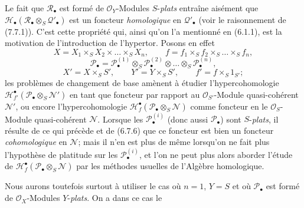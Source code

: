 \begin{scholium}[6.10.4]
Le fait que $\mathscr R_\bullet$ est formé de $\mathscr O_Y$-Modules
$S$-\emph{plats} entraîne aisément que $\mathscr H_\bullet(\mathscr R_\bullet\otimes_S\mathscr Q'_\bullet)$
est un foncteur \emph{homologique} en $\mathscr Q'_\bullet$ (voir le raisonnement de
(7.7.1)). C'est cette propriété qui, ainsi qu'on l'a mentionné en (6.1.1), est
la motivation de l'introduction de l'hypertor. Posons en effet
\[
  X=X_1\times_SX_2\times\ldots\times_SX_n,
  \qquad
  f=f_1\times_Sf_2\times_S\ldots\times_Sf_n,
\]
\[
  \mathscr P_\bullet
  =
  \mathscr P_\bullet^{(1)}
  \otimes_S\mathscr P_\bullet^{(2)}
  \otimes\ldots\otimes_S\mathscr P_\bullet^{(n)},
\]
\[
  X'=X\times_SS',
  \qquad
  Y'=Y\times_SS',
  \qquad
  f'=f\times_S1_{S'};
\]
les problèmes de changement de base amènent à étudier l'hypercohomologie $\mathscr H^\bullet_{f'}(\mathscr P_\bullet\otimes_S\mathscr N')$
en tant que foncteur par rapport au $\mathscr O_{S'}$-Module quasi-cohérent
$\mathscr N'$, ou encore l'hypercohomologie $\mathscr H^\bullet_f(\mathscr P_\bullet\otimes_S\mathscr N)$
comme foncteur en le $\mathscr O_S$-Module quasi-cohérent $\mathscr N$. Lorsque
les $\mathscr P_\bullet^{(i)}$ (donc aussi $\mathscr P_\bullet$) sont
$S$-\emph{plats}, il résulte de ce qui précède et de (6.7.6) que ce foncteur est bien
un foncteur \emph{cohomologique} en $\mathscr N$; mais il n'en est plus de même
lorsqu'on ne fait plus l'hypothèse de platitude sur les
$\mathscr P_\bullet^{(i)}$, et l'on ne peut plus alors aborder l'étude de $\mathscr H^\bullet_f(\mathscr P_\bullet\otimes_S\mathscr N)$
par les méthodes usuelles de l'Algèbre homologique.

Nous aurons toutefois surtout à utiliser le cas où $n=1$, $Y=S$ et où
$\mathscr P_\bullet$ est formé de $\mathscr O_X$-Modules $Y$-\emph{plats}. On a dans
ce cas le
\end{scholium}

